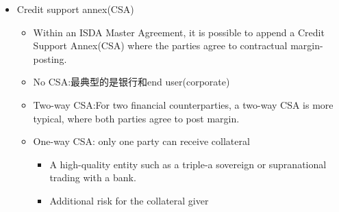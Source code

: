 \begin{itemize}
\begin{itemize}
\begin{itemize}
\end{itemize}
    \item Regulation covering margin-posting in bilateral markets is making initial margin more common.
    \item Uncleared margin requirements (UMR): regulators have
    started to impose bilateral margin requirements
    \begin{itemize}
    \item Reduction of systemic risk: reducing “contagion and spillover effects”减少传染和溢出效应
    \item Promotion of central clearing:aligning costs(notably initial margin)双边清算成本和中央清算成本一直，促进中央清算的采用
    \end{itemize}
    \item Apply to all OTC derivatives(FX swaps and forwards)
\end{itemize}


\item Credit support annex(CSA)
\begin{itemize}
    \item Within an ISDA Master Agreement, it is possible to append a Credit Support Annex(CSA) where the parties agree to contractual margin-posting.
    \item No CSA:最典型的是银行和end user(corporate)
    \item Two-way CSA:For two financial counterparties, a two-way CSA is more typical, where both parties agree to post margin.
    \item One-way CSA: only one party can receive collateral
    \begin{itemize}
    \item A high-quality entity such as a triple-a sovereign or supranational trading with a bank.
    \item Additional risk for the collateral giver
    \end{itemize}



\end{itemize}



\end{itemize}
